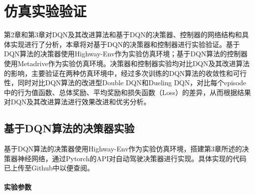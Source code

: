 %
%
%
%
%

\chapter{仿真实验验证}

第2章和第3章对DQN及其改进算法和基于DQN的决策器、控制器的网络结构和具体实现进行了分析，本章将对基于DQN的决策器和控制器进行实验验证。基于DQN算法的决策器使用Highway-Env作为实验仿真环境；基于DQN算法的控制器使用Metadrive作为实验仿真环境。决策器和控制器实验均对比DQN及其改进算法的影响，主要验证在两种仿真环境中，经过多次训练的DQN算法的收敛性和可行性，同时对比DQN算法的改进型Double DQN和Dueling DQN，对比每个episode中的行为值函数、总体奖励、平均奖励和损失函数（Loss）的差异，从而根据结果对DQN及其改进算法进行效果改进和优劣分析。

\section{基于DQN算法的决策器实验}

基于DQN算法的决策器使用Highway-Env作为实验仿真环境，搭建第3章所述的决策器神经网络，通过Pytorch的API对自动驾驶决策器进行实现。具体实现的代码已上传至Github中以便查阅\cite{highway-env-dqn}。

\subsubsection{实验参数}

\begin{table}[htbp]
    \caption{决策器网络参数}\label{决策器网络参数}
    \centering
    \renewcommand\arraystretch{1.5}
\end{table}

